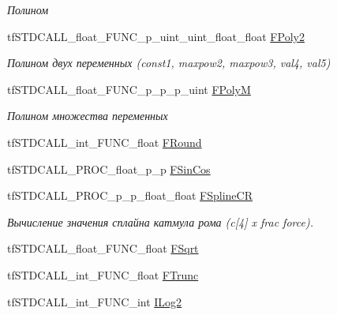 \begin{DoxyCompactItemize}
\begin{DoxyCompactList}\small\item\em Полином \end{DoxyCompactList}\item 
\hypertarget{structs_functions_math_c_p_u_a23733e280cc664f905426f7c50306dbd}{tf\-S\-T\-D\-C\-A\-L\-L\-\_\-float\-\_\-\-F\-U\-N\-C\-\_\-p\-\_\-uint\-\_\-uint\-\_\-float\-\_\-float \hyperlink{structs_functions_math_c_p_u_a23733e280cc664f905426f7c50306dbd}{F\-Poly2}}\label{structs_functions_math_c_p_u_a23733e280cc664f905426f7c50306dbd}

\begin{DoxyCompactList}\small\item\em Полином двух переменных (const1, maxpow2, maxpow3, val4, val5) \end{DoxyCompactList}\item 
\hypertarget{structs_functions_math_c_p_u_ad2822d568c6fd471382038125c705f86}{tf\-S\-T\-D\-C\-A\-L\-L\-\_\-float\-\_\-\-F\-U\-N\-C\-\_\-p\-\_\-p\-\_\-p\-\_\-uint \hyperlink{structs_functions_math_c_p_u_ad2822d568c6fd471382038125c705f86}{F\-Poly\-M}}\label{structs_functions_math_c_p_u_ad2822d568c6fd471382038125c705f86}

\begin{DoxyCompactList}\small\item\em Полином множества переменных \end{DoxyCompactList}\item 
tf\-S\-T\-D\-C\-A\-L\-L\-\_\-int\-\_\-\-F\-U\-N\-C\-\_\-float \hyperlink{structs_functions_math_c_p_u_ab43aba95d1a0a621acbfd7b47477fb1f}{F\-Round}
\item 
tf\-S\-T\-D\-C\-A\-L\-L\-\_\-\-P\-R\-O\-C\-\_\-float\-\_\-p\-\_\-p \hyperlink{structs_functions_math_c_p_u_a5dbb51f26ec2f3dd75b3ac563c453a3f}{F\-Sin\-Cos}
\item 
\hypertarget{structs_functions_math_c_p_u_a04a7e39c2896033fdff5f1ab76a7dc10}{tf\-S\-T\-D\-C\-A\-L\-L\-\_\-\-P\-R\-O\-C\-\_\-p\-\_\-p\-\_\-float\-\_\-float \hyperlink{structs_functions_math_c_p_u_a04a7e39c2896033fdff5f1ab76a7dc10}{F\-Spline\-C\-R}}\label{structs_functions_math_c_p_u_a04a7e39c2896033fdff5f1ab76a7dc10}

\begin{DoxyCompactList}\small\item\em Вычисление значения сплайна катмула рома (c\mbox{[}4\mbox{]} x frac force). \end{DoxyCompactList}\item 
tf\-S\-T\-D\-C\-A\-L\-L\-\_\-float\-\_\-\-F\-U\-N\-C\-\_\-float \hyperlink{structs_functions_math_c_p_u_a9a3c077404f8c98c7a2c1a5b1fe21f51}{F\-Sqrt}
\item 
tf\-S\-T\-D\-C\-A\-L\-L\-\_\-int\-\_\-\-F\-U\-N\-C\-\_\-float \hyperlink{structs_functions_math_c_p_u_a58a7273599e90918c59a409fd0d83de3}{F\-Trunc}
\item 
\hypertarget{structs_functions_math_c_p_u_a1753476620f2db6350381af36446e3a0}{tf\-S\-T\-D\-C\-A\-L\-L\-\_\-int\-\_\-\-F\-U\-N\-C\-\_\-int \hyperlink{structs_functions_math_c_p_u_a1753476620f2db6350381af36446e3a0}{I\-Log2}}\label{structs_functions_math_c_p_u_a1753476620f2db6350381af36446e3a0}


\end{DoxyCompactItemize}
